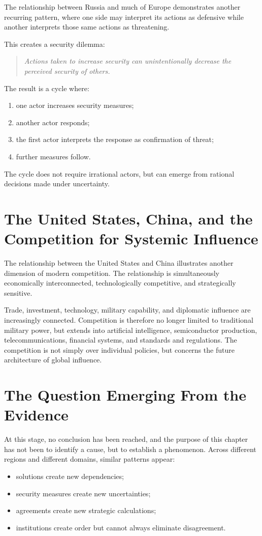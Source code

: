\documentclass[11pt,openany]{book}
\theoremstyle{plain}
\theoremstyle{definition}
\begin{document}
The relationship between Russia and much of Europe demonstrates another recurring pattern, where one side may interpret its actions as defensive while another interprets those same actions as threatening.

This creates a security dilemma:
\begin{quote}
\textit{Actions taken to increase security can unintentionally decrease the perceived security of others.}
\end{quote}

The result is a cycle where:
\begin{enumerate}
\item one actor increases security measures;
\item another actor responds;
\item the first actor interprets the response as confirmation of threat;
\item further measures follow.
\end{enumerate}

The cycle does not require irrational actors, but can emerge from rational decisions made under uncertainty.

\section*{The United States, China, and the Competition for Systemic Influence}

The relationship between the United States and China illustrates another dimension of modern competition. The relationship is simultaneously economically interconnected, technologically competitive, and strategically sensitive.

Trade, investment, technology, military capability, and diplomatic influence are increasingly connected. Competition is therefore no longer limited to traditional military power, but extends into artificial intelligence, semiconductor production, telecommunications, financial systems, and standards and regulations. The competition is not simply over individual policies, but concerns the future architecture of global influence.

\section*{The Question Emerging From the Evidence}

At this stage, no conclusion has been reached, and the purpose of this chapter has not been to identify a cause, but to establish a phenomenon. Across different regions and different domains, similar patterns appear:
\begin{itemize}
\item solutions create new dependencies;
\item security measures create new uncertainties;
\item agreements create new strategic calculations;
\item institutions create order but cannot always eliminate disagreement.
\end{itemize}
\end{document}
